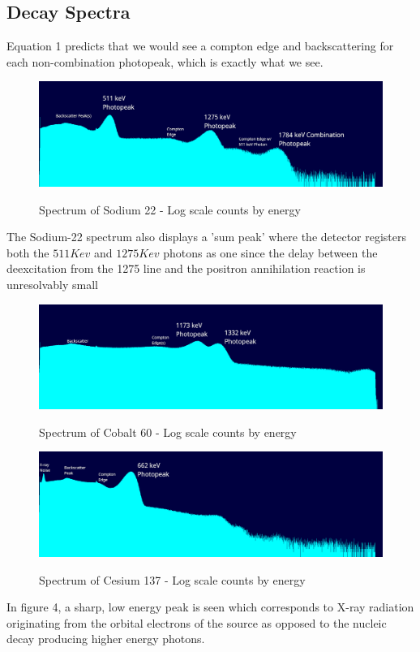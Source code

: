 \documentclass[11pt]{article} %
\begin{document}
    \subsection{Decay Spectra}
        Equation 1 predicts that we would see a compton edge and backscattering for each non-combination photopeak, which is exactly what we see.
        \begin{figure}[H] \centering \label{na22}
            \includegraphics[scale=0.3]{assets/na22_log_annotated.png}
            \caption{Spectrum of Sodium 22 - Log scale counts by energy}
        \end{figure}
        The Sodium-22 spectrum also displays a 'sum peak' where the detector registers both the $511\unit{Kev}$ and $1275\unit{Kev}$ photons as one since the delay between the deexcitation from the 1275 line and the positron annihilation reaction is unresolvably small
        \begin{figure}[H] \centering \label{co60}
            \includegraphics[scale=0.3]{assets/co60_log_annotated.png}
            \caption{Spectrum of Cobalt 60 - Log scale counts by energy}
        \end{figure}
        \begin{figure}[H] \centering \label{cs137}
            \includegraphics[scale=0.3]{assets/cs137_log_annotated.png}
            \caption{Spectrum of Cesium 137 - Log scale counts by energy}
        \end{figure}
        In figure 4, a sharp, low energy peak is seen which corresponds to X-ray radiation originating from the orbital electrons of the source as opposed to the nucleic decay producing higher energy photons.
\end{document}
